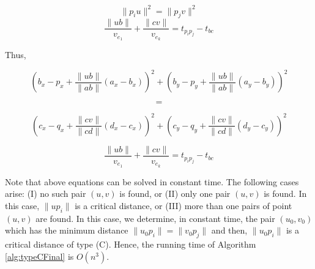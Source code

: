 \documentclass[12pt]{dalthesis}
\def\favoritefont{\bfseries \sffamily}
\def\QED{\ensuremath{{\Box}}}
\def\markatright#1{\leavevmode\unskip\nobreak\quad\hspace*{\fill}{#1}}
\newenvironment{proof}
	{\begin{trivlist}\item[\hskip\labelsep{\favoritefont Proof:}]}
	{\markatright{\QED}\end{trivlist}}
\newcommand{\REM}[1]{}
\begin{document}
\begin{proof}
\begin{displaymath}
\|p_iu\|^2 = \|p_jv\|^2 	
\end{displaymath}
\begin{displaymath}
	 \frac{\|ub\|}{v_{e_1}} + \frac{\|cv\|}{v_{e_k}} = t_{p_ip_j} - t_{bc}	
\end{displaymath}

Thus,

\begin{displaymath}
	(b_x-p_x+\frac{\|ub\|}{\|ab\|}(a_x-b_x))^2 + (b_y-p_y+	\frac{\|ub\|}{\|ab\|}(a_y-b_y))^2 		
\end{displaymath}

\begin{displaymath}
= 
\end{displaymath}

\begin{displaymath}
	(c_x-q_x+\frac{\|cv\|}{\|cd\|}(d_x-c_x))^2 + (c_y-q_y+	\frac{\|cv\|}{\|cd\|}(d_y-c_y))^2	
\end{displaymath}


\begin{displaymath}
	 \frac{\|ub\|}{v_{e_1}} + \frac{\|cv\|}{v_{e_k}} = t_{p_ip_j} - t_{bc}	
\end{displaymath}


\REM{
Replacing $\|ub\|$ by $S$ and $\|cv\|$ by $T$, we get:


\begin{displaymath}
	(b_x-p_x+\frac{S}{\|ab\|}(a_x-b_x))^2 + (b_y-p_y+	\frac{S}{\|ab\|}(a_y-b_y))^2 		
\end{displaymath}

\begin{displaymath}
= 
\end{displaymath}

\begin{displaymath}
	(c_x-q_x+\frac{T}{\|cd\|}(d_x-c_x))^2 + (c_y-q_y+	\frac{T}{\|cd\|}(d_y-c_y))^2	
\end{displaymath}


\begin{displaymath}
	 \frac{S}{v_{e_1}} + \frac{T}{v_{e_k}} = t_{p_ip_j} - t_{bc}	
\end{displaymath}
}

\vspace{0.2in}
Note that above equations can be solved in constant time. The following 
cases arise: (I) no such pair $(u,v)$ is  found, or 
(II) only one pair $(u,v)$ is found. In this case, $\|up_i\|$ is a critical distance, or
(III) more than one pairs of point $(u,v)$ are found. In this case, we determine, 
in constant time, the pair 
$(u_0,v_0)$ which has the minimum distance $\|u_0p_i\| = \|v_0p_j\|$ 
and then, $\|u_0p_i\|$ is a critical distance of type (C).
Hence, the running  time of Algorithm \ref{alg:typeCFinal} is $O(n^3)$.


\end{proof}
 
\end{document}
